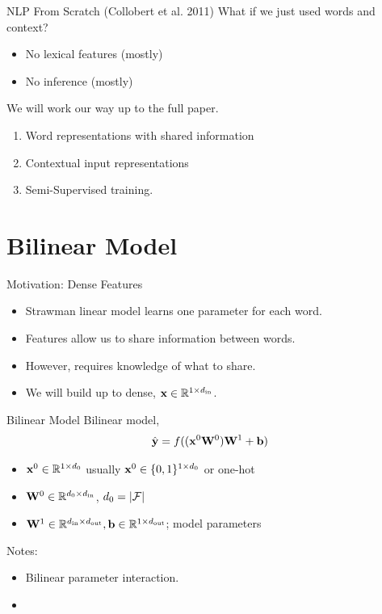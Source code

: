 \documentclass{beamer}
\begin{document}
\begin{frame}{NLP From Scratch (Collobert et al. 2011)}
  What if we just used words and context?

  \begin{itemize}
  \item No lexical features (mostly)
    \air

  \item No inference (mostly)
  \end{itemize}



  We will work our way up to the full paper.

  \begin{enumerate}
  \item Word representations with shared information
  \item Contextual input representations
  \item Semi-Supervised training.
  \end{enumerate}
\end{frame}


\section{Bilinear Model}


\begin{frame}{Motivation: Dense Features}
  \begin{itemize}
  \item Strawman linear model learns one parameter for each word.
    \air
  \item Features allow us to share information between words.
    \air
  \item However, requires knowledge of what to share.
    \air
  \item We will build up to dense, $\mathbf{x} \in \mathbb{R}^{1\times {d_{\mathrm{in}}}}$.
  \end{itemize}
\end{frame}


\begin{frame}{Bilinear Model}
  Bilinear model,
  \[\hat{\mathbf{y}} = f((\mathbf{x}^0 \mathbf{W}^0)\mathbf{W}^1 + \mathbf{b})\]
  \begin{itemize}
  \item $\mathbf{x}^0 \in \mathbb{R}^{1 \times d_0}$ usually $\mathbf{x}^0 \in \{0, 1\}^{1 \times d_0}$ or one-hot
  \item $\mathbf{W}^0 \in \mathbb{R}^{d_0 \times {d_{\mathrm{in}}}}$, $d_0 = |\mathcal{F}|$
  \item $\mathbf{W}^1 \in \mathbb{R}^{{d_{\mathrm{in}}} \times {d_{\mathrm{out}}}}, \mathbf{b} \in \mathbb{R}^{1 \times {d_{\mathrm{out}}}}$; model parameters
  \end{itemize}
  \air
  Notes:
  \begin{itemize}
  \item Bilinear parameter interaction.
  \item
  \end{itemize}

\end{frame}
\end{document}

